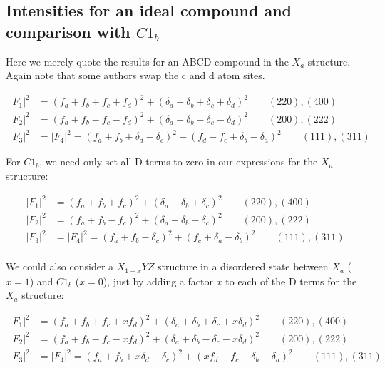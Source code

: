 \documentclass[aps,amsmath,amssymb,prb,superscriptaddress,longtable,preprint,fleqn]{revtex4}
\begin{document}
\subsection{Intensities for an ideal  compound and comparison with $C1_b$ }

Here we merely quote the results for an ABCD compound in the $X_a$ structure. Again note that some authors swap the c and d atom sites.

\begin{align}
|F_1|^2 &= \left(f_a + f_b + f_c + f_d\right)^2 + \left(\delta_a + \delta_b + \delta_c + \delta_d\right)^2  \qquad (220), (400)\\
|F_2|^2 &= \left(f_a + f_b - f_c - f_d\right)^2 + \left(\delta_a + \delta_b - \delta_c - \delta_d\right)^2 \qquad (200), (222)\\
|F_3|^2 &= |F_4|^2 = \left(f_a + f_b + \delta_d - \delta_c\right)^2 + \left(f_d - f_c + \delta_b - \delta_a\right)^2  \qquad (111), (311)
\end{align}

For $C1_b$, we need only set all D terms to zero in our expressions for the $X_a$ structure:

\begin{align}
|F_1|^2 &= \left(f_a + f_b + f_c\right)^2 + \left(\delta_a + \delta_b + \delta_c \right)^2  \qquad (220), (400)\\
|F_2|^2 &= \left(f_a + f_b - f_c \right)^2 + \left(\delta_a + \delta_b - \delta_c \right)^2 \qquad (200), (222)\\
|F_3|^2 &= |F_4|^2 = \left(f_a + f_b  - \delta_c\right)^2 + \left(f_c + \delta_a - \delta_b\right)^2 \qquad (111), (311) \\
\end{align}

We could also consider a $X_{1+x}YZ$ structure in a disordered state between $X_a$ ($x=1$) and $C1_b$ ($x=0$), just by adding a factor $x$ to each of the D terms for the $X_a$ structure:

\begin{align}
|F_1|^2 &= \left(f_a + f_b + f_c + xf_d\right)^2 + \left(\delta_a + \delta_b + \delta_c + x\delta_d\right)^2  \qquad (220), (400)\\
|F_2|^2 &= \left(f_a + f_b - f_c - xf_d\right)^2 + \left(\delta_a + \delta_b - \delta_c - x\delta_d\right)^2 \qquad (200), (222)\\
|F_3|^2 &= |F_4|^2 = \left(f_a + f_b + x\delta_d - \delta_c\right)^2 + \left(xf_d - f_c + \delta_b - \delta_a\right)^2 \qquad (111), (311)\\
\end{align}
\end{document}
